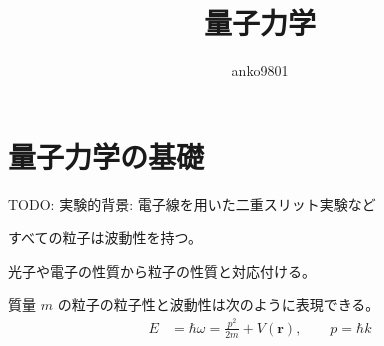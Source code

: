 \documentclass[uplatex,dvipdfmx,a4paper,11pt]{jlreq}
\title{量子力学}
\author{anko9801}
\newcommand{\rr}{\bm{r}}
\numberwithin{equation}{section}
\theoremstyle{definition}
\begin{document}
\maketitle
\tableofcontents
\clearpage

\section{量子力学の基礎}
TODO: 実験的背景: 電子線を用いた二重スリット実験など
\begin{axiom}[粒子の波動性]
  すべての粒子は波動性を持つ。
\end{axiom}
光子や電子の性質から粒子の性質と対応付ける。
\begin{definition}[ド・ブロイの関係式]
  質量 $m$ の粒子の粒子性と波動性は次のように表現できる。
  \begin{align}
    E & = \hbar\omega = \frac{p^2}{2m} + V(\rr), \qquad p = \hbar k
  \end{align}
\end{definition}
\end{document}
